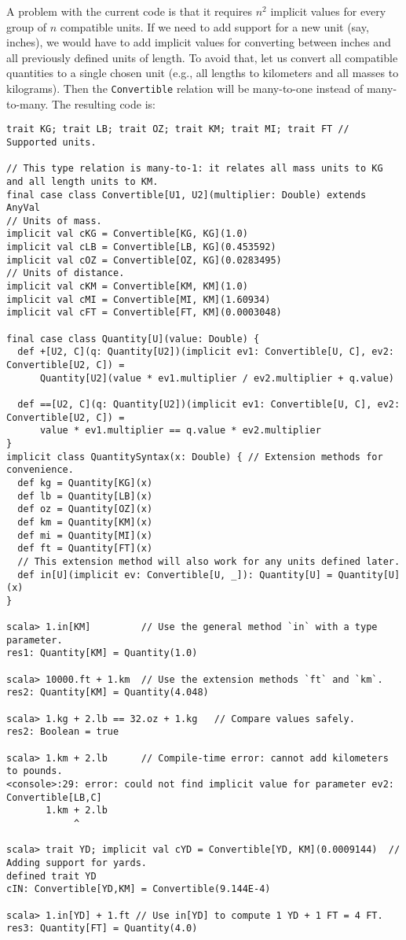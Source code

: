 A problem with the current code is that it requires $n^{2}$ implicit
values for every group of $n$ compatible units. If we need to add
support for a new unit (say, inches), we would have to add implicit
values for converting between inches and all previously defined units
of length. To avoid that, let us convert all compatible quantities
to a single chosen unit (e.g., all lengths to kilometers and all masses
to kilograms). Then the \lstinline!Convertible! relation will be
many-to-one instead of many-to-many.
The resulting code is:
\begin{lstlisting}[frame=single,fillcolor={\color{black}},framesep={0.2mm},framexleftmargin=2mm,framexrightmargin=2mm,framextopmargin=2mm,framexbottommargin=2mm]
trait KG; trait LB; trait OZ; trait KM; trait MI; trait FT // Supported units.

// This type relation is many-to-1: it relates all mass units to KG and all length units to KM.
final case class Convertible[U1, U2](multiplier: Double) extends AnyVal
// Units of mass.
implicit val cKG = Convertible[KG, KG](1.0)
implicit val cLB = Convertible[LB, KG](0.453592)
implicit val cOZ = Convertible[OZ, KG](0.0283495)
// Units of distance.
implicit val cKM = Convertible[KM, KM](1.0)
implicit val cMI = Convertible[MI, KM](1.60934)
implicit val cFT = Convertible[FT, KM](0.0003048)

final case class Quantity[U](value: Double) {
  def +[U2, C](q: Quantity[U2])(implicit ev1: Convertible[U, C], ev2: Convertible[U2, C]) =
      Quantity[U2](value * ev1.multiplier / ev2.multiplier + q.value)

  def ==[U2, C](q: Quantity[U2])(implicit ev1: Convertible[U, C], ev2: Convertible[U2, C]) =
      value * ev1.multiplier == q.value * ev2.multiplier
}
implicit class QuantitySyntax(x: Double) { // Extension methods for convenience.
  def kg = Quantity[KG](x)
  def lb = Quantity[LB](x)
  def oz = Quantity[OZ](x)
  def km = Quantity[KM](x)
  def mi = Quantity[MI](x)
  def ft = Quantity[FT](x)
  // This extension method will also work for any units defined later.
  def in[U](implicit ev: Convertible[U, _]): Quantity[U] = Quantity[U](x)
}

scala> 1.in[KM]         // Use the general method `in` with a type parameter.
res1: Quantity[KM] = Quantity(1.0)

scala> 10000.ft + 1.km  // Use the extension methods `ft` and `km`.
res2: Quantity[KM] = Quantity(4.048)

scala> 1.kg + 2.lb == 32.oz + 1.kg   // Compare values safely.
res2: Boolean = true

scala> 1.km + 2.lb      // Compile-time error: cannot add kilometers to pounds.
<console>:29: error: could not find implicit value for parameter ev2: Convertible[LB,C]
       1.km + 2.lb
            ^

scala> trait YD; implicit val cYD = Convertible[YD, KM](0.0009144)  // Adding support for yards.
defined trait YD
cIN: Convertible[YD,KM] = Convertible(9.144E-4)

scala> 1.in[YD] + 1.ft // Use in[YD] to compute 1 YD + 1 FT = 4 FT.
res3: Quantity[FT] = Quantity(4.0)
\end{lstlisting}


